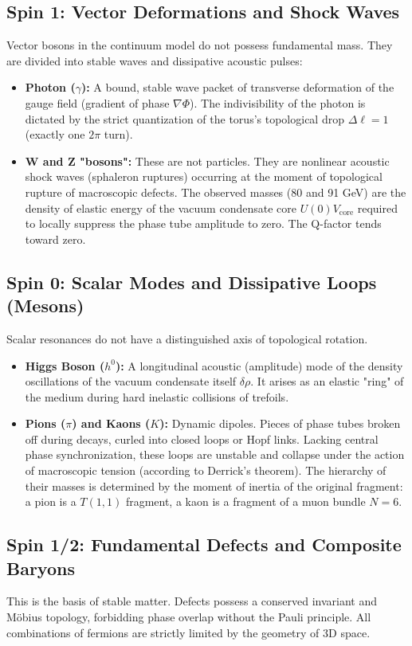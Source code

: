 \documentclass[11pt,a4paper]{article}
\begin{document}
\subsection{Spin 1: Vector Deformations and Shock Waves}
	Vector bosons in the continuum model do not possess fundamental mass. They are divided into stable waves and dissipative acoustic pulses:
	\begin{itemize}
		\item \textbf{Photon ($\gamma$):} A bound, stable wave packet of transverse deformation of the gauge field (gradient of phase $\nabla \Phi$). The indivisibility of the photon is dictated by the strict quantization of the torus's topological drop $\Delta \ell = 1$ (exactly one $2\pi$ turn).
		\item \textbf{W and Z "bosons":} These are not particles. They are nonlinear acoustic shock waves (sphaleron ruptures) occurring at the moment of topological rupture of macroscopic defects. The observed masses (80 and 91 GeV) are the density of elastic energy of the vacuum condensate core $U(0)V_{\text{core}}$ required to locally suppress the phase tube amplitude to zero. The Q-factor tends toward zero.
	\end{itemize}
	
\subsection{Spin 0: Scalar Modes and Dissipative Loops (Mesons)}
	Scalar resonances do not have a distinguished axis of topological rotation.
	\begin{itemize}
		\item \textbf{Higgs Boson ($h^0$):} A longitudinal acoustic (amplitude) mode of the density oscillations of the vacuum condensate itself $\delta \rho$. It arises as an elastic "ring" of the medium during hard inelastic collisions of trefoils. 
		\item \textbf{Pions ($\pi$) and Kaons ($K$):} Dynamic dipoles. Pieces of phase tubes broken off during decays, curled into closed loops or Hopf links. Lacking central phase synchronization, these loops are unstable and collapse under the action of macroscopic tension (according to Derrick's theorem). The hierarchy of their masses is determined by the moment of inertia of the original fragment: a pion is a $T(1,1)$ fragment, a kaon is a fragment of a muon bundle $N=6$.
	\end{itemize}
	
\subsection{Spin 1/2: Fundamental Defects and Composite Baryons}
	This is the basis of stable matter. Defects possess a conserved invariant and Möbius topology, forbidding phase overlap without the Pauli principle. All combinations of fermions are strictly limited by the geometry of 3D space.
	
\end{document}
